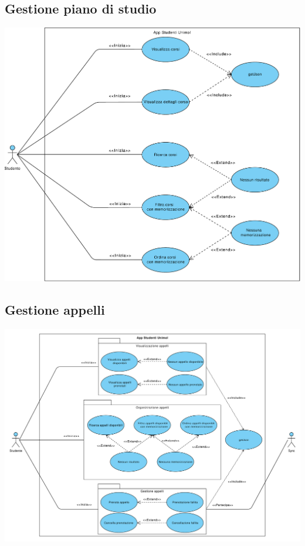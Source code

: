 \subsection{Gestione piano di studio}
\begin{center}
	\includegraphics[width=6.5in]{imgs/gruppo1/use_case_diagrams/UCD1-gestione_piano_di_studio.pdf}
\end{center}
\newpage

\subsection{Gestione appelli}
\begin{center}
	\includegraphics[width=6.5in]{imgs/gruppo1/use_case_diagrams/UCD2-gestione_appelli.pdf}
\end{center}
\newpage

